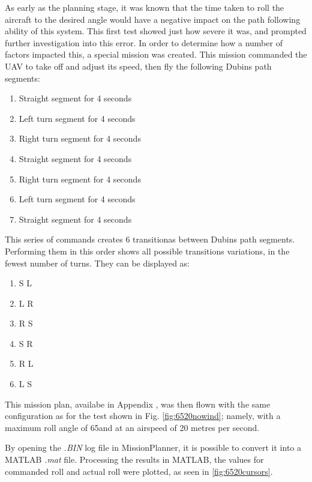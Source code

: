 As early as the planning stage, it was known that the time taken to roll the aircraft to the desired angle would have a negative impact on the path following ability of this system. This first test showed just how severe it was, and prompted further investigation into this error. In order to determine how a number of factors impacted this, a special mission was created. This mission commanded the UAV to take off and adjust its speed, then fly the following Dubins path segments:

\begin{enumerate}
	\item Straight segment for 4 seconds
	\item Left turn segment for 4 seconds
	\item Right turn segment for 4 seconds
	\item Straight segment for 4 seconds
	\item Right turn segment for 4 seconds
	\item Left turn segment for 4 seconds
	\item Straight segment for 4 seconds
\end{enumerate}

This series of commands creates 6 transitionas between Dubins path segments. Performing them in this order shows all possible transitions variations, in the fewest number of turns. They can be displayed as:

\begin{enumerate}
	\item S \textrightarrow L
	\item L \textrightarrow R
	\item R \textrightarrow S
	\item S \textrightarrow R
	\item R \textrightarrow L
	\item L \textrightarrow S
\end{enumerate}

This mission plan, availabe in Appendix %
, was then flown with the same configuration as for the test shown in Fig. \ref{fig:6520nowind}; namely, with a maximum roll angle of 65\degree and at an airspeed of 20 metres per second. 

By opening the \textit{.BIN} log file in MissionPlanner, it is possible to convert it into a MATLAB \textit{.mat} file. Processing the results in MATLAB, the values for commanded roll and actual roll were plotted, as seen in \ref{fig:6520cursors}. 

